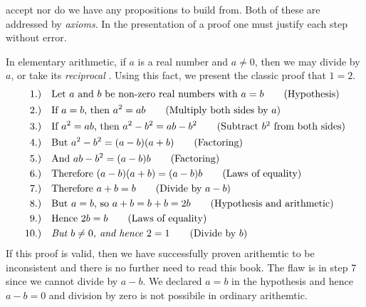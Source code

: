         accept nor do we have any propositions to build from. Both of these are
        addressed by \textit{axioms}. In the presentation of a proof one must
        justify each step without error.
        \begin{example}
            In elementary arithmetic, if $a$ is a real number and $a\ne{0}$,
            then we may divide by $a$, or take its \textit{reciprocal}%
            . Using this fact, we present the classic proof
            that $1=2$.
            \begin{align}
                1.)\quad&
                \text{Let $a$ and $b$ be non-zero real numbers with $a=b$}
                \tag{Hypothesis}\\
                2.)\quad
                &\text{If $a=b$, then $a^{2}=ab$}
                \tag{Multiply both sides by $a$}\\
                3.)\quad
                &\text{If $a^{2}=ab$, then $a^{2}-b^{2}=ab-b^{2}$}
                \tag{Subtract $b^{2}$ from both sides}\\
                4.)\quad
                &\text{But $a^{2}-b^{2}=(a-b)(a+b)$}
                \tag{Factoring}\\
                5.)\quad
                &\text{And $ab-b^{2}=(a-b)b$}
                \tag{Factoring}\\
                6.)\quad
                &\text{Therefore $(a-b)(a+b)=(a-b)b$}
                \tag{Laws of equality}\\
                7.)\quad
                &\text{Therefore $a+b=b$}
                \tag{Divide by $a-b$}\\
                8.)\quad
                &\text{But $a=b$, so $a+b=b+b=2b$}
                \tag{Hypothesis and arithmetic}\\
                9.)\quad
                &\text{Hence $2b=b$}
                \tag{Laws of equality}\\
                10.)\quad
                &\textit{But $b\ne{0}$, and hence $2=1$}
                \tag{Divide by $b$}
            \end{align}
            If this proof is valid, then we have successfully proven arithemtic
            to be inconsistent and there is no further need to read this book.
            The flaw is in step 7 since we cannot divide by $a-b$. We declared
            $a=b$ in the hypothesis and hence $a-b=0$ and division by zero is
            not possibile in ordinary arithemtic.
        \end{example}

